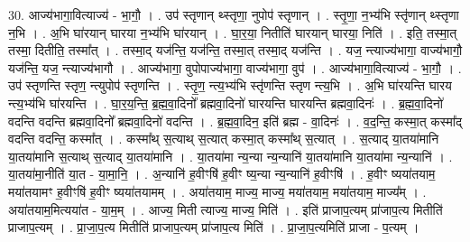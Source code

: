 \documentclass[17pt]{extarticle}
\begin{document}
30. आज्य॑भागा॒वित्याज्य॑ - भा॒गौ॒ । . उप॑ स्तृणान् थ्स्तृणा॒ नुपोप॑ स्तृणान् । . स्तृ॒णा॒ न॒भ्य॑भि स्तृ॑णान् थ्स्तृणा न॒भि । . अ॒भि घा॑रयान् घारया न॒भ्य॑भि घा॑रयान् । . घा॒र॒या॒ नितीति॑ घारयान् घारया॒ निति॑ । . इति॒ तस्मा॒त् तस्मा॒ दितीति॒ तस्मा᳚त् । . तस्मा॒द् यज॑न्ति॒ यज॑न्ति॒ तस्मा॒त् तस्मा॒द् यज॑न्ति । . यज॒ न्त्याज्य॑भागा॒ वाज्य॑भागौ॒ यज॑न्ति॒ यज॒ न्त्याज्य॑भागौ । . आज्य॑भागा॒ वुपोपाज्य॑भागा॒ वाज्य॑भागा॒ वुप॑ । . आज्य॑भागा॒वित्याज्य॑ - भा॒गौ॒ । . उप॑ स्तृणन्ति स्तृण॒ न्त्युपोप॑ स्तृणन्ति । . स्तृ॒ण॒ न्त्य॒भ्य॑भि स्तृ॑णन्ति स्तृण न्त्य॒भि । . अ॒भि घा॑रयन्ति घारय न्त्य॒भ्य॑भि घा॑रयन्ति । . घा॒र॒य॒न्ति॒ ब्र॒ह्म॒वा॒दिनो᳚ ब्रह्मवा॒दिनो॑ घारयन्ति घारयन्ति ब्रह्मवा॒दिनः॑ । . ब्र॒ह्म॒वा॒दिनो॑ वदन्ति वदन्ति ब्रह्मवा॒दिनो᳚ ब्रह्मवा॒दिनो॑ वदन्ति । . ब्र॒ह्म॒वा॒दिन॒ इति॑ ब्रह्म - वा॒दिनः॑ । . व॒द॒न्ति॒ कस्मा॒त् कस्मा᳚द् वदन्ति वदन्ति॒ कस्मा᳚त् । . कस्मा᳚थ् स॒त्याथ् स॒त्यात् कस्मा॒त् कस्मा᳚थ् स॒त्यात् । . स॒त्याद् या॒तया॑मानि या॒तया॑मानि स॒त्याथ् स॒त्याद् या॒तया॑मानि । . या॒तया॑मा न्य॒न्या न्य॒न्यानि॑ या॒तया॑मानि या॒तया॑मा न्य॒न्यानि॑ । . या॒तया॑मा॒नीति॑ या॒त - या॒मा॒नि॒ । . अ॒न्यानि॑ ह॒वीꣳषि॑ ह॒वीꣳ ष्य॒न्या न्य॒न्यानि॑ ह॒वीꣳषि॑ । . ह॒वीꣳ ष्यया॑तयाम॒ मया॑तयामꣳ ह॒वीꣳषि॑ ह॒वीꣳ ष्यया॑तयामम् । . अया॑तयाम॒ माज्य॒ माज्य॒ मया॑तयाम॒ मया॑तयाम॒ माज्य᳚म् । . अया॑तयाम॒मित्यया॑त - या॒म॒म् । . आज्य॒ मिती त्याज्य॒ माज्य॒ मिति॑ । . इति॑ प्राजाप॒त्यम् प्रा॑जाप॒त्य मितीति॑ प्राजाप॒त्यम् । . प्रा॒जा॒प॒त्य मितीति॑ प्राजाप॒त्यम् प्रा॑जाप॒त्य मिति॑ । . प्रा॒जा॒प॒त्यमिति॑ प्राजा - प॒त्यम् । \newline
\end{document}
